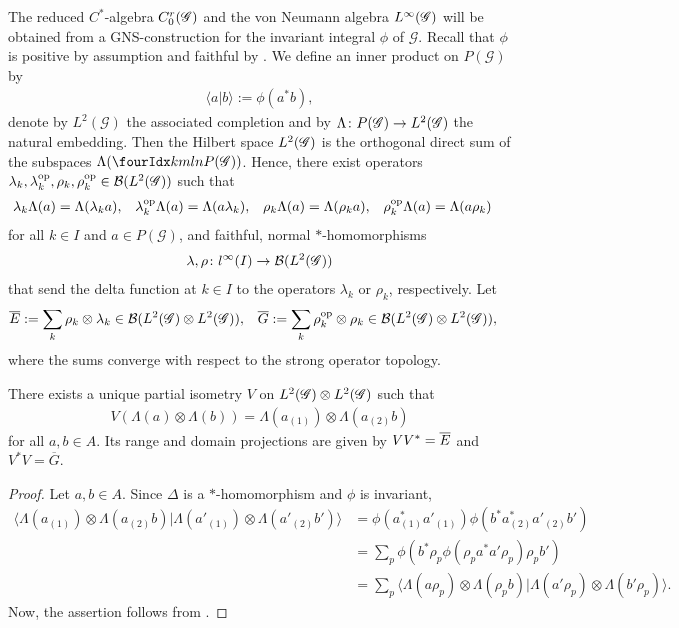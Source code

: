 The reduced $C^{*}$-algebra $C^{r}_{0}(\mathscr{G})$ and the von Neumann algebra
$L^{\infty}(\mathscr{G})$ will be obtained from a GNS-construction for the invariant
integral $\phi$ of $\mathscr{G}$. Recall that $\phi$ is positive by
assumption and faithful by \cite[Lemma
1.39]{DCT1}.  We define an inner product on $P(\mathscr{G})$ by
\begin{align*}
  \langle a|b\rangle :=\phi(a^{*}b),
\end{align*}
denote by $L^{2}(\mathscr{G})$ the associated completion and by
$\Lambda \colon P(\mathscr{G}) \to L^{2}(\mathscr{G})$ the natural embedding.
Then the Hilbert space $L^{2}(\mathscr{G})$ is the orthogonal direct sum of the
subspaces $\Lambda(\Gr{P(\mathscr{G})}{k}{l}{m}{n})$. Hence, there exist
operators $\lambda_{k},\lambda_{k}^{\operatorname{\mathrm{op}}},\rho_{k},\rho_{k}^{\operatorname{\mathrm{op}}}\in
{\cal B}(L^{2}(\mathscr{G}))$ such that
\begin{align*}
  \lambda_{k}\Lambda(a)&= \Lambda(\lambda_{k} a), &
  \lambda^{\operatorname{\mathrm{op}}}_{k}\Lambda(a) &= \Lambda(a\lambda_{k}), &
  \rho_{k}\Lambda(a) &= \Lambda(\rho_{k}a), &
  \rho_{k}^{\operatorname{\mathrm{op}}}\Lambda(a) &= \Lambda(a\rho_{k})
\end{align*}
for all $k\in I$ and $a\in P(\mathscr{G})$, and faithful, normal $*$-homomorphisms
\begin{align} \label{eq:vn-lambda-rho}
  \lambda,\rho \colon l^{\infty}(I) \to
  {\cal B}(L^{2}(\mathscr{G}))
\end{align}
that send the delta function at $k\in I$ to the operators
$\lambda_{k}$ or $\rho_{k}$, respectively. Let
\begin{align*}
  \overline{E} &:=\sum_{k} \rho_{k} \otimes \lambda_{k} \in \mathcal{B}(L^{2}(\mathscr{G})
  \otimes L^{2}(\mathscr{G})), & \overline{G} &:=
  \sum_{k} \rho_{k}^{\operatorname{\mathrm{op}}} \otimes \rho_{k} \in \mathcal{B}(L^{2}(\mathscr{G})
  \otimes L^{2}(\mathscr{G})),
\end{align*}
where the sums converge with respect to the strong operator
topology.
\begin{Lem} \label{lemma:partial-isometry}
There exists a unique partial isometry $V$ on $L^{2}(\mathscr{G}) \otimes L^{2}(\mathscr{G})$
such that
\begin{align*}
  V(\Lambda(a) \otimes \Lambda(b)) = \Lambda(a_{(1)}) \otimes \Lambda(a_{(2)}b)
\end{align*}
for all $a,b\in A$. Its range and domain projections are given by $VV^{*} = \overline{E}$
and $V^{*}V = \overline{G}$.
\end{Lem}
\begin{proof}
  Let $a,b \in A$. Since $\Delta$ is a $*$-homomorphism and $\phi$ is
invariant,
  \begin{align*}
    \langle \Lambda(a_{(1)}) \otimes
    \Lambda(a_{(2)}b)|\Lambda(a'_{(1)}) \otimes
    \Lambda(a'_{(2)}b')\rangle &=
    \phi(a_{(1)}^{*}a'_{(1)})\phi(b^{*}a_{(2)}^{*}a'_{(2)}b') \\
    &= \sum_{p}
    \phi(b^{*}\rho_{p}\phi(\rho_{p}a^{*}a'\rho_{p})\rho_{p}b') \\
    & =\sum_{p} \langle\Lambda(a\rho_{p}) \otimes \Lambda(\rho_{p}b) |
    \Lambda(a'\rho_{p}) \otimes \Lambda(b'\rho_{p})\rangle.
  \end{align*}
  Now, the assertion follows from \cite[Proposition 1.30]{DCT1}.
\end{proof}


